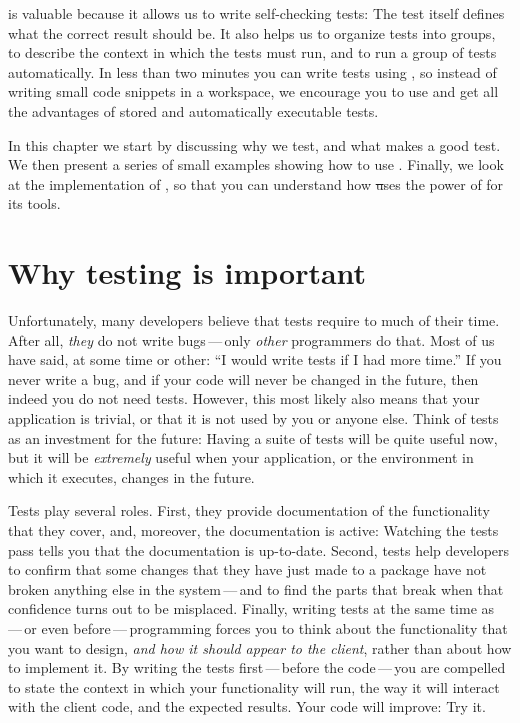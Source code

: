 \documentclass[a4paper,10pt,twoside]{book}
\begin{document}
\sunit is valuable because it allows us to write self-checking tests:
The test itself defines what the correct result should be.
It also helps us to organize tests into groups, to describe the context in which the tests must run, and to run a group of tests automatically.
In less than two minutes you can write tests using \sunit, so instead of writing small code snippets in a workspace, we encourage you to use \sunit and get all the advantages of stored and automatically executable tests.

In this chapter we start by discussing why we test, and what makes a good test.
We then present a series of small examples showing how to use \sunit.
Finally, we look at the implementation of \sunit, so that you can understand how
\st uses the power of  for its tools.

\section{Why testing is important}
\label{sec:why}

Unfortunately, many developers believe that tests require to much of their time.
After all, \emph{they} do not write bugs\,---\,only \emph{other} programmers do that.
Most of us have said, at some time or other:
``I would write tests if I had more time.''
If you never write a bug, and if your code will never be changed in the future, then indeed you do not need tests.
However, this most likely also means that your application is trivial, or that it is not used by you or anyone else.
Think of tests as an investment for the future:
Having a suite of tests will be quite useful now, but it will be \emph{extremely} useful when your application, or the environment in which it executes, changes in the future.

Tests play several roles.
First, they provide documentation of the functionality that they cover, and, moreover, the documentation is active:
Watching the tests pass tells you that the documentation is up-to-date.
Second, tests help developers to confirm that some changes that they have just made to a package have not broken anything else in the system\,---\,and to find the parts that break when that confidence turns out to be misplaced.
Finally, writing tests at the same time as\,---\,or even before\,---\,programming forces you to think about the functionality that you want to design, \emph{and how it should appear to the client}, rather than about how to implement it.
By writing the tests first\,---\,before the code\,---\,you are compelled to state
the context in which your functionality will run, the way it will interact with the client code, and the expected results.
Your code will improve:
Try it.
\end{document}
